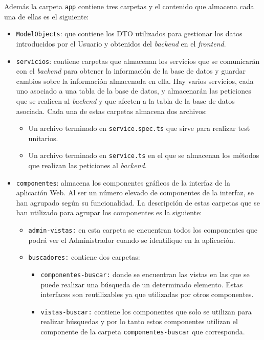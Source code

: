  Además la carpeta \texttt{app} contiene tres carpetas y el contenido que almacena cada una de ellas es el siguiente:
\begin{itemize}
    \item  \texttt{ModelObjects}: que contiene los DTO utilizados para gestionar los datos introducidos por el Usuario y obtenidos del \textit{backend} en el \textit{frontend}.
        
    \item  \texttt{servicios}: contiene carpetas que almacenan los servicios que se comunicarán con el \textit{backend} para obtener la información de la base de datos y guardar cambios sobre la información almacenada en ella. Hay varios servicios, cada uno asociado a una tabla de la base de datos, y almacenarán las peticiones que se realicen al \textit{backend} y que afecten a la tabla de la base de datos asociada. Cada una de estas carpetas almacena dos archivos:
    \begin{itemize}
        \item Un archivo terminado en \texttt{service.spec.ts} que sirve para realizar test unitarios.
        \item Un archivo terminado en \texttt{service.ts} en el que se almacenan los métodos que realizan las peticiones al \textit{backend}.
    \end{itemize}
    
    
    
     
    \item  \texttt{componentes}: almacena los componentes gráficos de la interfaz de la aplicación Web. Al ser un número elevado de componentes de la interfaz, se han agrupado según su funcionalidad. La descripción de estas carpetas que se han utilizado para agrupar los componentes es la siguiente:
    \begin{itemize}
        \item \texttt{admin-vistas:} en esta carpeta se encuentran todos los componentes que podrá ver el Administrador cuando se identifique en la aplicación. 
        \item \texttt{buscadores:} contiene dos carpetas:
        \begin{itemize}
            \item \texttt{componentes-buscar:} donde se encuentran las vistas en las que se puede realizar una búsqueda de un determinado elemento. Estas interfaces son reutilizables ya que utilizadas por otros componentes.
            \item \texttt{vistas-buscar:} contiene los componentes que solo se utilizan para realizar búsquedas y por lo tanto estos componentes utilizan el componente de la carpeta \texttt{componentes-buscar} que corresponda.
        \end{itemize}


\end{itemize}
\end{itemize}
